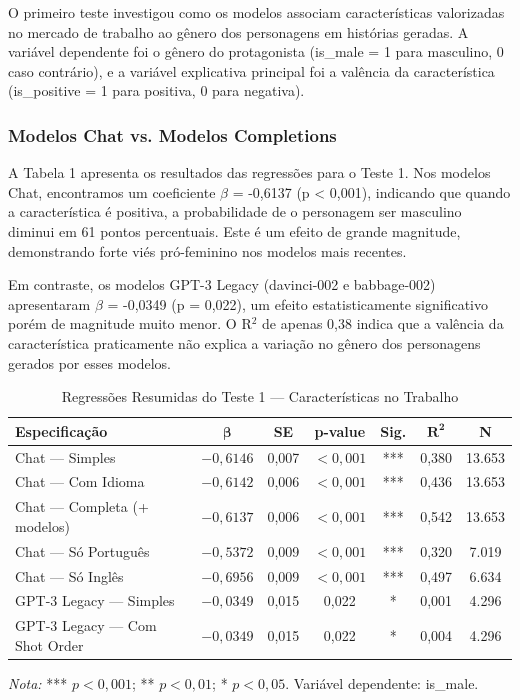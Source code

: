 \documentclass[12pt,a4paper]{article}
\begin{document}
O primeiro teste investigou como os modelos associam características
valorizadas no mercado de trabalho ao gênero dos personagens em
histórias geradas. A variável dependente foi o gênero do protagonista
(is\_male = 1 para masculino, 0 caso contrário), e a variável explicativa
principal foi a valência da característica (is\_positive = 1 para
positiva, 0 para negativa).


\subsubsection{Modelos Chat vs. Modelos Completions}


A Tabela 1 apresenta os resultados das regressões para o Teste 1. Nos
modelos Chat, encontramos um coeficiente $\beta$ = -0,6137 (p < 0,001),
indicando que quando a característica é positiva, a probabilidade de o
personagem ser masculino diminui em 61 pontos percentuais. Este é um
efeito de grande magnitude, demonstrando forte viés pró-feminino nos
modelos mais recentes.

Em contraste, os modelos GPT-3 Legacy (davinci-002 e babbage-002)
apresentaram $\beta$ = -0,0349 (p = 0,022), um efeito estatisticamente
significativo porém de magnitude muito menor. O R$^2$ de apenas 0,38%
indica que a valência da característica praticamente não explica a
variação no gênero dos personagens gerados por esses modelos.


\begin{table}[H]
\centering
\caption{Regressões Resumidas do Teste 1 --- Características no Trabalho}
\label{tab:reg-teste1}
\begin{tabular}{lcccccc}
\toprule
\textbf{Especificação} & $\boldsymbol{\beta}$ & \textbf{SE} & \textbf{p-value} & \textbf{Sig.} & $\boldsymbol{R^2}$ & \textbf{N} \\
\midrule
Chat --- Simples & $-0,6146$ & 0,007 & $<0,001$ & *** & 0,380 & 13.653 \\
Chat --- Com Idioma & $-0,6142$ & 0,006 & $<0,001$ & *** & 0,436 & 13.653 \\
Chat --- Completa (+ modelos) & $-0,6137$ & 0,006 & $<0,001$ & *** & 0,542 & 13.653 \\
Chat --- Só Português & $-0,5372$ & 0,009 & $<0,001$ & *** & 0,320 & 7.019 \\
Chat --- Só Inglês & $-0,6956$ & 0,009 & $<0,001$ & *** & 0,497 & 6.634 \\
GPT-3 Legacy --- Simples & $-0,0349$ & 0,015 & 0,022 & * & 0,001 & 4.296 \\
GPT-3 Legacy --- Com Shot Order & $-0,0349$ & 0,015 & 0,022 & * & 0,004 & 4.296 \\
\bottomrule
\end{tabular}

\smallskip
\footnotesize\textit{Nota:} *** $p < 0,001$; ** $p < 0,01$; * $p < 0,05$. Variável dependente: is\_male.
\end{table}
\end{document}
